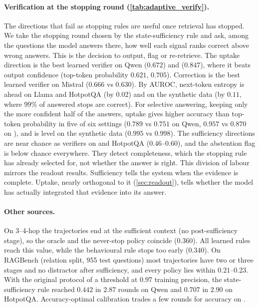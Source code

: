 \paragraph{Verification at the stopping round (\cref{tab:adaptive_verify}).} The directions that fail as stopping rules are useful once retrieval has stopped. We take the stopping round chosen by the state-sufficiency rule and ask, among the questions the model answers there, how well each signal ranks correct above wrong answers. This is the decision to output, flag or re-retrieve. The uptake direction is the best learned verifier on \musique{} Qwen ($0.672$) and \twowiki{} ($0.847$), where it beats output confidence (top-token probability $0.621$, $0.705$). Correction is the best learned verifier on Mistral ($0.666$ vs $0.630$). By AUROC, next-token entropy is ahead on Llama and HotpotQA (by $0.02$) and on the synthetic data (by $0.11$, where $99\%$ of answered stops are correct). For selective answering, keeping only the more confident half of the answers, uptake gives higher accuracy than top-token probability in five of six settings ($0.789$ vs $0.751$ on \musique{} Qwen, $0.957$ vs $0.870$ on \twowiki{}), and is level on the synthetic data ($0.995$ vs $0.998$). The sufficiency directions are near chance as verifiers on \musique{} and HotpotQA ($0.46$--$0.60$), and the abstention flag is below chance everywhere. They detect completeness, which the stopping rule has already selected for, not whether the answer is right. This division of labour mirrors the readout results. Sufficiency tells the system when the evidence is complete. Uptake, nearly orthogonal to it (\cref{sec:readout}), tells whether the model has actually integrated that evidence into its answer.

\begin{table}[h]
\centering\scriptsize
\setlength{\tabcolsep}{3pt}
\resizebox{\linewidth}{!}{}
\caption{Verification once retrieval stops (state-sufficiency stopping rule): AUROC of each signal at the stopping round for the correctness of the answer given there (answered stops only). Bold: best per column. Bottom: accuracy of all answered stops and of the half ranked highest by top-token probability or by the uptake direction.}
\label{tab:adaptive_verify}
\end{table}

\paragraph{Other sources.} On 3--4-hop \musique{} the trajectories end at the sufficient context (no post-sufficiency stage), so the oracle and the never-stop policy coincide ($0.360$). All learned rules reach this value, while the behavioural rule stops too early ($0.340$). On RAGBench (relation split, 955 test questions) most trajectories have two or three stages and no distractor after sufficiency, and every policy lies within $0.21$--$0.23$. With the original protocol of a threshold at $0.97$ training precision, the state-sufficiency rule reached $0.442$ in $2.87$ rounds on \musique{} Qwen and $0.707$ in $2.90$ on HotpotQA. Accuracy-optimal calibration trades a few rounds for accuracy on \musique{}.
